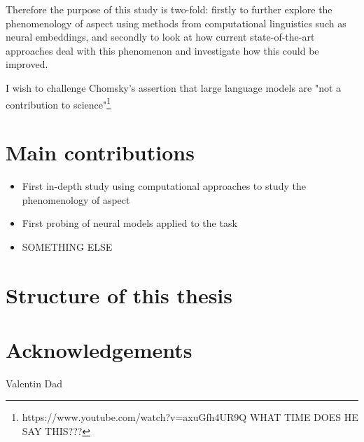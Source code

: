 Therefore the purpose of this study is two-fold: firstly to further explore the phenomenology of aspect using methods from computational linguistics such as neural embeddings, and secondly to look at how current state-of-the-art approaches deal with this phenomenon and investigate how this could be improved.


I wish to challenge Chomsky's assertion that large language models are "not a contribution to science"\footnote{https://www.youtube.com/watch?v=axuGfh4UR9Q WHAT TIME DOES HE SAY THIS???}

\section*{Main contributions}
\begin{itemize}
    \item First in-depth study using computational approaches to study the phenomenology of aspect 
    \item First probing of neural models applied to the task
    \item SOMETHING ELSE
\end{itemize}
\section*{Structure of this thesis}

\section*{Acknowledgements}
Valentin
Dad